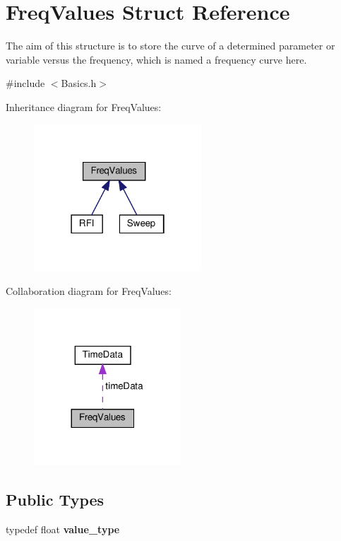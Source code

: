 \hypertarget{structFreqValues}{}\section{Freq\+Values Struct Reference}
\label{structFreqValues}


The aim of this structure is to store the curve of a determined parameter or variable versus the frequency, which is named a frequency curve here.  




{\ttfamily \#include $<$Basics.\+h$>$}



Inheritance diagram for Freq\+Values\+:\nopagebreak
\begin{figure}[H]
\begin{center}
\leavevmode
\includegraphics[width=178pt]{structFreqValues__inherit__graph}
\end{center}
\end{figure}


Collaboration diagram for Freq\+Values\+:\nopagebreak
\begin{figure}[H]
\begin{center}
\leavevmode
\includegraphics[width=156pt]{structFreqValues__coll__graph}
\end{center}
\end{figure}
\subsection*{Public Types}
\begin{DoxyCompactItemize}
\item 
\mbox{\label{structFreqValues_af93b30b6d2ecdcb55be9810292ed301f}} 
typedef float {\bfseries value\+\_\+type}
\end{DoxyCompactItemize}
